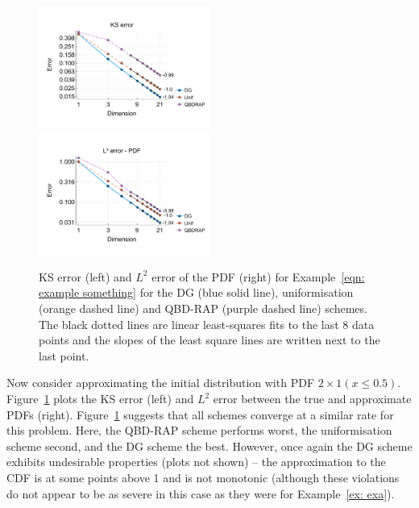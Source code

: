 \begin{example}\label{eqn: example something}
	\begin{figure}[h]
		\centering
		\includegraphics[width=0.5\textwidth,trim={0.5cm 0.8cm 0.2cm 1.25cm},clip]{chapter6/figs/comp/fun2/meshs_ks_error_formatted.pdf}%
		\includegraphics[width=0.5\textwidth,trim={0.5cm 0.8cm 0.2cm 1.25cm},clip]{chapter6/figs/comp/fun2/meshs_l2_pdf_error_formatted.pdf}
		\caption{KS error (left) and \(L^2\) error of the PDF (right) for Example~\ref{eqn: example something} for the DG (blue solid line), uniformisation (orange dashed line) and QBD-RAP (purple dashed line) schemes. The black dotted lines are linear least-squares fits to the last 8 data points and the slopes of the least square lines are written next to the last point.}
		\label{fig: fun 2 comp} 
	\end{figure}
	Now consider approximating the initial distribution with PDF \(2\times 1(x\leq 0.5)\). Figure~\ref{fig: fun 2 comp} plots the KS error (left) and \(L^2\) error between the true and approximate PDFs (right). Figure~\ref{fig: fun 2 comp} suggests that all schemes converge at a similar rate for this problem. Here, the QBD-RAP scheme performs worst, the uniformisation scheme second, and the DG scheme the best. However, once again the DG scheme exhibits undesirable properties (plots not shown) -- the approximation to the CDF is at some points above 1 and is not monotonic (although these violations do not appear to be as severe in this case as they were for Example~\ref{ex: exa}). 
\end{example}

